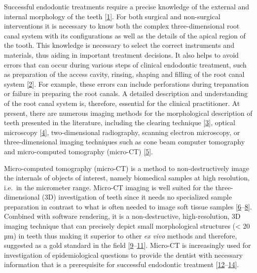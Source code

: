 \documentclass[
  american,
]{article}
\begin{document}
Successful endodontic treatments require a precise knowledge of the external and internal morphology of the teeth {[}\protect\hyperlink{ref-q3HKadWY}{1}{]}.
For both surgical and non-surgical interventions it is necessary to know both the complex three-dimensional root canal system with its configurations as well as the details of the apical region of the tooth.
This knowledge is necessary to select the correct instruments and materials, thus aiding in important treatment decisions.
It also helps to avoid errors that can occur during various steps of clinical endodontic treatment, such as preparation of the access cavity, rinsing, shaping and filling of the root canal system {[}\protect\hyperlink{ref-AHVImOFB}{2}{]}.
For example, these errors can include perforations during trepanation or failure in preparing the root canals.
A detailed description and understanding of the root canal system is, therefore, essential for the clinical practitioner.
At present, there are numerous imaging methods for the morphological description of teeth presented in the literature, including the clearing technique {[}\protect\hyperlink{ref-11Kln4Lf0}{3}{]}, optical microscopy {[}\protect\hyperlink{ref-gA7iMD0q}{4}{]}, two-dimensional radiography, scanning electron microscopy, or three-dimensional imaging techniques such as cone beam computer tomography and micro-computed tomography (micro-CT) {[}\protect\hyperlink{ref-1HkTk4VKM}{5}{]}.

Micro-computed tomography (micro-CT) is a method to non-destructively image the internals of objects of interest, namely biomedical samples at high resolution, i.e.~in the micrometer range.
Micro-CT imaging is well suited for the three-dimensional (3D) investigation of teeth since it needs no specialized sample preparation in contrast to what is often needed to image soft tissue samples {[}\protect\hyperlink{ref-XahGmSLJ}{6}--\protect\hyperlink{ref-6C8eCzkj}{8}{]}.
Combined with software rendering, it is a non-destructive, high-resolution, 3D imaging technique that can precisely depict small morphological structures (\textless{} 20 µm) in teeth thus making it superior to other \emph{ex vivo} methods and therefore, suggested as a gold standard in the field {[}\protect\hyperlink{ref-pTcCEU9H}{9}--\protect\hyperlink{ref-19T8cyNhk}{11}{]}.
Micro-CT is increasingly used for investigation of epidemiological questions to provide the dentist with necessary information that is a prerequisite for successful endodontic treatment {[}\protect\hyperlink{ref-OttTicsv}{12}--\protect\hyperlink{ref-RUBxFFUa}{14}{]}.
\end{document}
